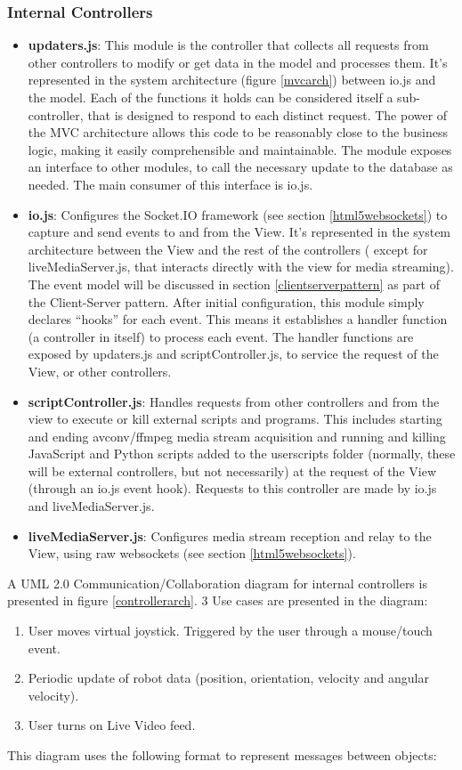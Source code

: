\subsubsection{Internal Controllers}
\begin{itemize}
	\item \textbf{updaters.js}: This module is the controller that collects all requests from other controllers to modify 
	or get data in the model and processes them. It's represented in the system architecture (figure \ref{mvcarch}) between 
	io.js and the model. Each of the functions it holds can be considered itself a sub-controller, that is designed to 
	respond to each distinct request. The power of the MVC architecture allows this code to be reasonably close to the 
	business logic, making it easily comprehensible and maintainable. The module exposes an interface to other modules, to 
	call the necessary update to the database as needed. The main consumer of this interface is io.js.	
	\item \textbf{io.js}: Configures the Socket.IO framework (see section \ref{html5websockets}) to capture and send events 
	to and from the View. It's represented in the system architecture between the View and the rest of the controllers (
	except for liveMediaServer.js, that interacts directly with the view for media streaming). The event model will be 
	discussed in section \ref{clientserverpattern} as part of the Client-Server pattern. After initial configuration, this 
	module simply declares ``hooks'' for each event. This means it establishes a handler function (a controller in itself) 
	to process each event. The handler functions are exposed by updaters.js and scriptController.js, to service the request 
	of the View, or other controllers.
	\item \textbf{scriptController.js}: Handles requests from other controllers and from the view to execute or kill 
	external scripts and programs. This includes starting and ending avconv/ffmpeg media stream acquisition and running and 
	killing JavaScript and Python scripts added to the userscripts folder (normally, these will be external controllers, 
	but not necessarily) at the request of the View (through an io.js event hook). Requests to this controller are made by 
	io.js and liveMediaServer.js.
	\item \textbf{liveMediaServer.js}: Configures media stream reception and relay to the View, using raw websockets (see 
	section \ref{html5websockets}).
\end{itemize}
A UML 2.0 Communication/Collaboration diagram for internal controllers is presented in figure \ref{controllerarch}. 3 Use 
cases are presented in the diagram:
\begin{enumerate}
	\item User moves virtual joystick. Triggered by the user through a mouse/touch event.
	\item Periodic update of robot data (position, orientation, velocity and angular velocity).
	\item User turns on Live Video feed.
\end{enumerate}
This diagram uses the following format to represent messages between objects:\\

